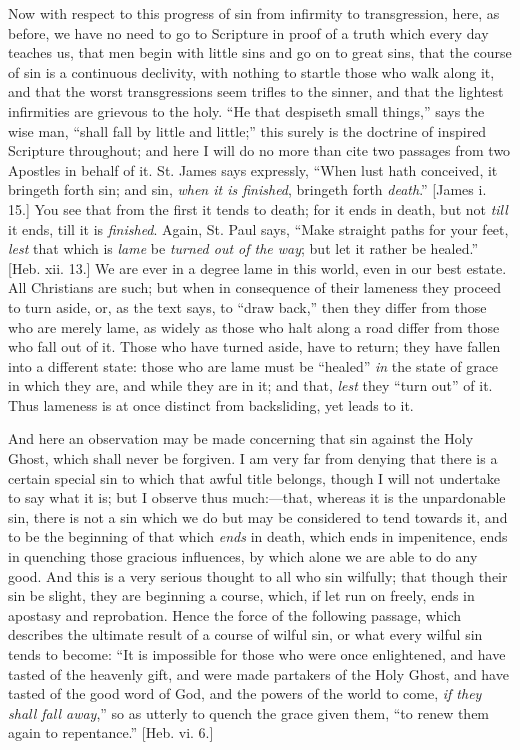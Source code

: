 Now with respect to this progress of sin from infirmity to
transgression, here, as before, we have no need to go to Scripture in
proof of a truth which every day teaches us, that men begin with
little sins and go on to great sins, that the course of sin is a
continuous declivity, with nothing to startle those who walk along it,
and that the worst transgressions seem trifles to the sinner, and that
the lightest infirmities are grievous to the holy. ``He that
despiseth small things,'' says the wise man, ``shall fall by
little and little;'' this surely is the doctrine of inspired
Scripture throughout; and here I will do no more than cite two
passages from two Apostles in behalf of it. St. James says expressly,
``When lust hath conceived, it bringeth forth sin; and sin, \emph{when
it is finished}, bringeth forth \emph{death}.'' [James i. 15.] You see
that from the first it tends to death; for it ends in death, but not \emph{till}
it ends, till it is \emph{finished}. Again, St. Paul says, ``Make
straight paths for your feet, \emph{lest} that which is \emph{lame} be \emph{turned
out of the way}; but let it rather be healed.'' [Heb. xii. 13.]
We are ever in a degree lame in this world, even in our best estate.
All Christians are such; but when in consequence of their lameness
they proceed to turn aside, or, as the text says, to ``draw
back,'' then they differ from those who are merely lame, as widely
as those who halt along a road differ from those who fall out of it.
Those who have turned aside, have to return; they have fallen into a
different state: those who are lame must be ``healed'' \emph{in}
the state of grace in which they are, and while they are in it; and
that, \emph{lest} they ``turn out'' of it. Thus lameness is at
once distinct from backsliding, yet leads to it.

And here an observation may be made concerning that sin against the
Holy Ghost, which shall never be forgiven. I am very far from denying
that there is a certain special sin to which that awful title belongs,
though I will not undertake to say what it is; but I observe thus
much:—that, whereas it is the unpardonable sin, there is not a sin
which we do but may be considered to tend towards it, and to be the
beginning of that which \emph{ends} in death, which ends in
impenitence, ends in quenching those gracious influences, by which
alone we are able to do any good. And this is a very serious thought
to all who sin wilfully; that though their sin be slight, they are
beginning a course, which, if let run on freely, ends in apostasy and
reprobation. Hence the force of the following passage, which describes
the ultimate result of a course of wilful sin, or what every wilful
sin tends to become: ``It is impossible for those who were once
enlightened, and have tasted of the heavenly gift, and were made
partakers of the Holy Ghost, and have tasted of the good word of God,
and the powers of the world to come, \emph{if they shall fall away},''
so as utterly to quench the grace given them, ``to renew them
again to repentance.'' [Heb. vi. 6.]

